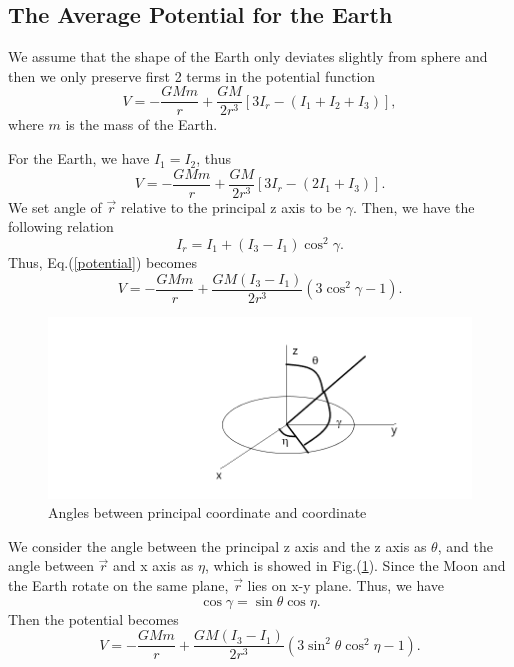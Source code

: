 \documentclass[%
 reprint,
 amsmath,amssymb,
 aps,
]{revtex4-1}
\begin{document}
\subsection{The Average Potential for the Earth}
We assume that the shape of the Earth only deviates slightly from sphere and then we only preserve first 2 terms in the potential function
\begin{equation}
    V=-\frac{GMm}{r}+\frac{GM}{2r^3}\left[3I_r-\left(I_1+I_2+I_3\right)\right],
\end{equation}
where $m$ is the mass of the Earth.

For the Earth, we have $I_1=I_2$, thus
\begin{equation}
     V=-\frac{GMm}{r}+\frac{GM}{2r^3}\left[3I_r-\left(2I_1+I_3\right)\right].
     \label{potential}
\end{equation}
We set angle of $\vec{r}$ relative to the principal z axis to be $\gamma$. Then, we have the following relation
\begin{equation}
    I_r=I_1+(I_3-I_1)\cos^2{\gamma}.
\end{equation}
Thus, Eq.(\ref{potential}) becomes
\begin{equation}
    V=-\frac{GMm}{r}+\frac{GM(I_3-I_1)}{2r^3}(3\cos^2{\gamma}-1).
\end{equation}
\begin{figure}
    \centering
    \includegraphics[scale=0.4]{PrincipalCoordinate.png}
    \caption{Angles between principal coordinate and coordinate}
    \label{fig:my_label}
\end{figure}
We consider the angle between the principal z axis and the z axis as $\theta$, and the angle between $\vec{r}$ and x axis as $\eta$, which is showed in Fig.(\ref{fig:my_label}). Since the Moon and the Earth rotate on the same plane, $\vec{r}$ lies on x-y plane. Thus, we have
\begin{equation}
    \cos{\gamma}=\sin{\theta}\cos{\eta}.
\end{equation}
Then the potential becomes
\begin{equation}
     V=-\frac{GMm}{r}+\frac{GM(I_3-I_1)}{2r^3}(3\sin^2\theta\cos^2\eta-1).
\end{equation}
\end{document}
